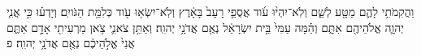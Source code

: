 \documentclass{openreader}
\begin{document}
וַהֲקִמֹתִ֥י לָהֶ֛ם מַטָּ֖ע לְשֵׁ֑ם וְלֹֽא־יִהְי֨וּ עֹ֜וד אֲסֻפֵ֤י רָעָב֙ בָּאָ֔רֶץ וְלֹֽא־יִשְׂא֥וּ עֹ֖וד כְּלִמַּ֥ת הַגֹּויִֽם׃ 
וְיָדְע֗וּ כִּ֣י אֲנִ֧י יְהוָ֛ה אֱלֹהֵיהֶ֖ם אִתָּ֑ם וְהֵ֗מָּה עַמִּי֙ בֵּ֣ית יִשְׂרָאֵ֔ל נְאֻ֖ם אֲדֹנָ֥י יְהוִֽה׃ 
וְאַתֵּ֥ן צֹאנִ֛י צֹ֥אן מַרְעִיתִ֖י אָדָ֣ם אַתֶּ֑ם אֲנִי֙ אֱלֹ֣הֵיכֶ֔ם נְאֻ֖ם אֲדֹנָ֥י יְהוִֽה׃ פ 
\end{document}
